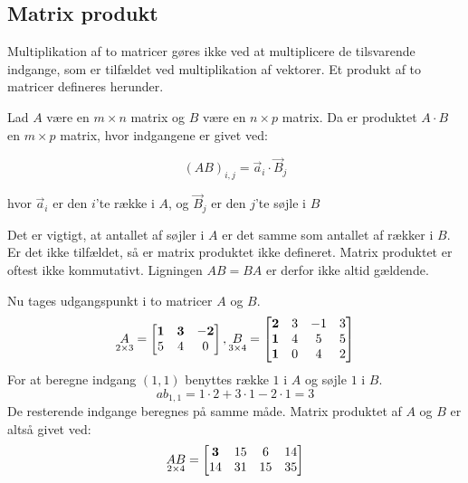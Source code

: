 \subsection{Matrix produkt}
Multiplikation af to matricer gøres ikke ved at multiplicere de tilsvarende indgange, som er tilfældet ved multiplikation af vektorer. Et produkt af to matricer defineres herunder. 
\begin{defn} 
Lad $A$ være en $m \times n$ matrix og $B$ være en $n \times p$ matrix. Da er produktet $A \cdot B$ en $m \times p$ matrix, hvor indgangene er givet ved: 

$$(AB)_{i,j} = \vec{a}_i \cdot \vec{B}_j$$

hvor $\vec{a}_i$ er den $i$'te række i $A$, og $\vec{B}_j$ er den $j$'te søjle i $B$
\label{def:(matrixprodukt)}
\end{defn}
Det er vigtigt, at antallet af søjler i $A$ er det samme som antallet af rækker i $B$. Er det ikke tilfældet, så er matrix produktet ikke defineret. Matrix produktet er oftest ikke kommutativt. Ligningen $AB=BA$ er derfor ikke altid gældende. 
\begin{eks}
Nu tages udgangspunkt i to matricer $A$ og $B$. 
\begin{align*}
\underset{2 \times 3}{A}= \begin{bmatrix}
	\bf{1} & \bf{3} & \bf{-2} \\
	5 & 4 & 0 	
\end{bmatrix},
\underset{3 \times 4}{B}= \begin{bmatrix}
	\bf{2} & 3 & -1 & 3 \\
	\bf{1} & 4 & 5 & 5\\
	\bf{1} & 0 & 4 & 2
\end{bmatrix}  
\end{align*}
For at beregne indgang $(1,1)$ benyttes række $1$ i $A$ og søjle $1$ i $B$. 
$$ab_{1,1}=1\cdot 2+3\cdot 1-2 \cdot 1 = 3$$ 
De resterende indgange beregnes på samme måde. 
Matrix produktet af $A$ og $B$ er altså givet ved:
\begin{align*}
\underset{2 \times 4}{AB}= \begin{bmatrix}
	\bf{3} & 15 & 6 & 14 \\
	14 & 31 & 15 & 35
\end{bmatrix}  
\end{align*}
\end{eks}